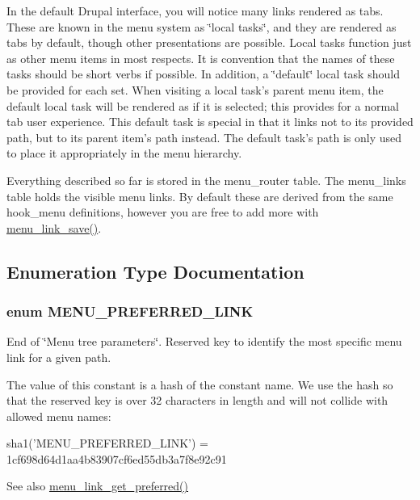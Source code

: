 In the default Drupal interface, you will notice many links rendered as tabs. These are known in the menu system as \char`\"{}local tasks\char`\"{}, and they are rendered as tabs by default, though other presentations are possible. Local tasks function just as other menu items in most respects. It is convention that the names of these tasks should be short verbs if possible. In addition, a \char`\"{}default\char`\"{} local task should be provided for each set. When visiting a local task's parent menu item, the default local task will be rendered as if it is selected; this provides for a normal tab user experience. This default task is special in that it links not to its provided path, but to its parent item's path instead. The default task's path is only used to place it appropriately in the menu hierarchy.

Everything described so far is stored in the menu\_\-router table. The menu\_\-links table holds the visible menu links. By default these are derived from the same hook\_\-menu definitions, however you are free to add more with \hyperlink{group__menu_ga133b177fee00b678a19afba18fb81ebc}{menu\_\-link\_\-save()}. 

\subsection{Enumeration Type Documentation}
\hypertarget{group__menu_ga4bc08b83d5906e9acd6f8102993af852}{
\subsubsection[{MENU\_\-PREFERRED\_\-LINK}]{\setlength{\rightskip}{0pt plus 5cm}enum {\bf MENU\_\-PREFERRED\_\-LINK}}}
\label{group__menu_ga4bc08b83d5906e9acd6f8102993af852}
End of \char`\"{}Menu tree parameters\char`\"{}. Reserved key to identify the most specific menu link for a given path.

The value of this constant is a hash of the constant name. We use the hash so that the reserved key is over 32 characters in length and will not collide with allowed menu names: 
\begin{DoxyCode}
 sha1('MENU_PREFERRED_LINK') = 1cf698d64d1aa4b83907cf6ed55db3a7f8e92c91
\end{DoxyCode}


\begin{DoxySeeAlso}{See also}
\hyperlink{group__menu_gad5fbd7dfd77f1496d636d130a3ff591d}{menu\_\-link\_\-get\_\-preferred()} 
\end{DoxySeeAlso}


